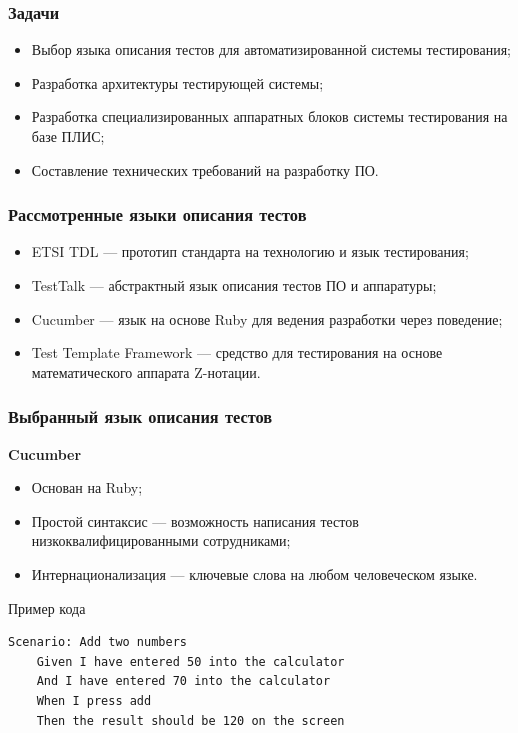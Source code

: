\documentclass{beamer}
\begin{document}

\begin{frame}
\frametitle{Задачи}
\begin{itemize}
\item Выбор языка описания тестов для автоматизированной системы тестирования;
\item Разработка архитектуры тестирующей системы;
\item Разработка специализированных аппаратных блоков системы тестирования на базе ПЛИС;
\item Составление технических требований на разработку ПО.
\end{itemize}
\end{frame}


\begin{frame}
\frametitle{Рассмотренные языки описания тестов}
\begin{itemize}
\item ETSI TDL --- прототип стандарта на технологию и язык тестирования;
\item TestTalk --- абстрактный язык описания тестов ПО и аппаратуры;
\item Cucumber --- язык на основе Ruby для ведения разработки через поведение;
\item Test Template Framework --- средство для тестирования на основе математического аппарата Z-нотации.
\end{itemize}
\end{frame}


\begin{frame}[fragile]
\frametitle{Выбранный язык описания тестов}
\textbf{Cucumber}
\begin{itemize}
\item Основан на Ruby;
\item Простой синтаксис --- возможность написания тестов низкоквалифицированными сотрудниками;
\item Интернационализация --- ключевые слова на любом человеческом языке.
\end{itemize}
\begin{block}{Пример кода}
\begin{verbatim}
Scenario: Add two numbers
    Given I have entered 50 into the calculator
    And I have entered 70 into the calculator
    When I press add
    Then the result should be 120 on the screen
\end{verbatim}
\end{block}
\end{frame}
\end{document}
